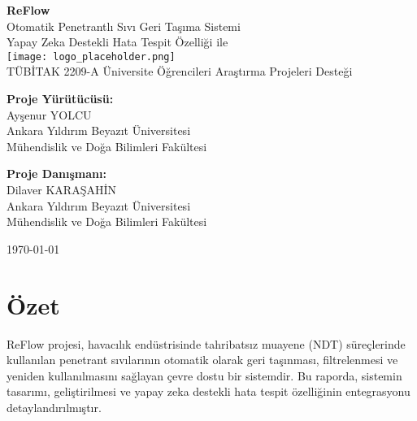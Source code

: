 \documentclass[12pt,a4paper]{article}
\begin{document}
\begin{titlepage}
    \centering
    \vspace*{2cm}
    
    {\huge\bfseries ReFlow}\\[0.5cm]
    {\Large Otomatik Penetrantlı Sıvı Geri Taşıma Sistemi}\\[0.3cm]
    {\large Yapay Zeka Destekli Hata Tespit Özelliği ile}\\[2cm]
    
    \texttt{[image: logo\_placeholder.png]}\\[2cm]
    
    {\Large TÜBİTAK 2209-A Üniversite Öğrencileri Araştırma Projeleri Desteği}\\[1cm]
    
    \begin{minipage}{0.4\textwidth}
        \begin{flushleft}
            \textbf{Proje Yürütücüsü:}\\
            Ayşenur YOLCU\\
            Ankara Yıldırım Beyazıt Üniversitesi\\
            Mühendislik ve Doğa Bilimleri Fakültesi
        \end{flushleft}
    \end{minipage}
    \hfill
    \begin{minipage}{0.4\textwidth}
        \begin{flushright}
            \textbf{Proje Danışmanı:}\\
            Dilaver KARAŞAHİN\\
            Ankara Yıldırım Beyazıt Üniversitesi\\
            Mühendislik ve Doğa Bilimleri Fakültesi
        \end{flushright}
    \end{minipage}
    
    \vfill
    {\large \today}
\end{titlepage}

\tableofcontents
\newpage

\section{Özet}

ReFlow projesi, havacılık endüstrisinde tahribatsız muayene (NDT) süreçlerinde kullanılan penetrant sıvılarının otomatik olarak geri taşınması, filtrelenmesi ve yeniden kullanılmasını sağlayan çevre dostu bir sistemdir. Bu raporda, sistemin tasarımı, geliştirilmesi ve yapay zeka destekli hata tespit özelliğinin entegrasyonu detaylandırılmıştır.
\end{document}
